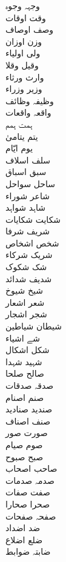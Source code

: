 \documentclass[a4paper]{article}
\begin{document}
\begin{multicols}{3}
\begin{tabbing}
وجہہ \> وجوہ\\
وقت \> اوقات\\
وصف \> اوصاف\\
وزن \> اوزان\\
ولی \> اولیاء\\
وقیل \> وقلا\\
وارث \> ورثاء\\
وزیر \> وزراء\\
وظیفہ \> وظائف\\
واقعہ \> واقعات\\
ہمت \> ہمم\\
یتم \> یتامیٰ\\
یوم \> ایّام\\
سلف \> اسلاف\\
سبق \> اسباق\\
ساحل \> سواحل\\
شاعر \> شوراء\\
شاہد \> شواہد\\
شکایت \> شکایات\\
شریف \> شرفا\\
شخص \> اشخاص\\
شریک \> شرکاء\\
شک \> شکوک\\
شدیف \> شدائد\\
شیخ \> شیوخ\\
شعر \> اشعار\\
شجر \> اشجار\\
شیطان \> شیاطین\\
شے \> اشیاء\\
شکل \> اشکال\\
شہید \> شہدا\\
صالح \> صلحا\\
صدقہ \> صدقات\\
صنم \> اصنام\\
صندید \> صنادید\\
صنف \> اصناف\\
صورت \> صور\\
صوم \> صیام\\
صبح \> صبوح\\
صاحب \> اصحاب\\
صدمہ \> صدمات\\
صفت \> صفات\\
صحرا \> صحارا\\
صفحہ \> صفحات\\
ضد \> اضداد\\
ضلع \> اضلاع\\
ضابتہ \> ضوابط\\

\end{tabbing}
\end{multicols}
\end{document}
